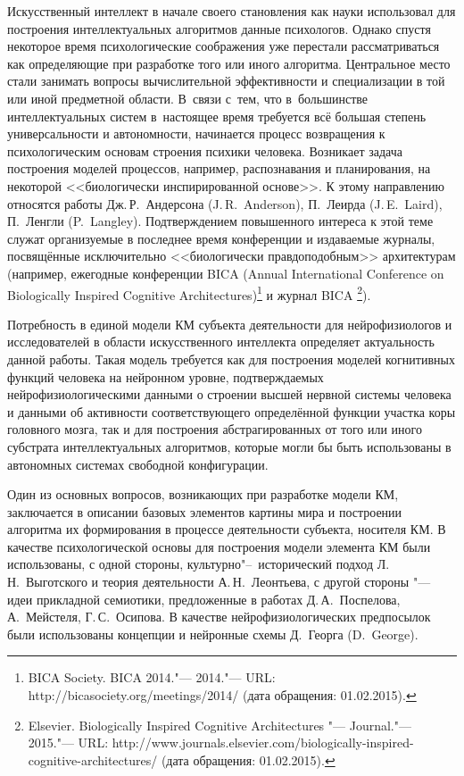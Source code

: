 Искусственный интеллект в начале своего становления как науки использовал для построения интеллектуальных алгоритмов данные психологов. Однако спустя некоторое время психологические соображения уже перестали рассматриваться как определяющие при разработке того или иного алгоритма. Центральное место стали занимать вопросы вычислительной эффективности и специализации в той или иной предметной области. В~связи с~тем, что в~большинстве интеллектуальных систем в~настоящее время требуется всё большая степень универсальности и автономности, начинается процесс возвращения к психологическим основам строения психики человека. Возникает задача построения моделей процессов, например, распознавания и планирования, на некоторой <<биологически инспирированной основе>>. К этому направлению относятся работы Дж.\,Р.~Андерсона (J.\,R.~Anderson), П.~Леирда (J.\,E.~Laird), П.~Ленгли (P.~Langley). Подтверждением повышенного интереса к этой теме служат организуемые в последнее время конференции и издаваемые журналы, посвящённые исключительно <<биологически правдоподобным>> архитектурам (например, ежегодные конференции BICA (Annual International Conference on Biologically Inspired Cognitive Architectures)\footnote{BICA Society. BICA 2014."--- 2014."--- URL: http://bicasociety.org/meetings/2014/ (дата	обращения: 01.02.2015).} и журнал BICA \footnote{Elsevier. Biologically Inspired Cognitive Architectures "--- Journal."--- 2015."---
URL: http://www.journals.elsevier.com/biologically-inspired-cognitive-architectures/ (дата	обращения: 01.02.2015).}).

Потребность в единой модели КМ субъекта деятельности для нейрофизиологов и исследователей в области искусственного интеллекта определяет актуальность данной работы. Такая модель требуется как для построения моделей когнитивных функций человека на нейронном уровне, подтверждаемых нейрофизиологическими данными о строении высшей нервной системы человека и данными об активности соответствующего определённой функции участка коры головного мозга, так и для построения абстрагированных от того или иного субстрата интеллектуальных алгоритмов, которые могли бы быть использованы в автономных системах свободной конфигурации.

Один из основных вопросов, возникающих при разработке модели КМ, заключается в описании базовых элементов картины мира и построении алгоритма их формирования в процессе деятельности субъекта, носителя КМ. В качестве психологической основы для построения модели элемента КМ были использованы, с одной стороны, культурно"--~исторический подход Л.\,Н.~Выготского и теория деятельности А.\,Н.~Леонтьева, с другой стороны "--- идеи прикладной семиотики, предложенные в работах Д.\,А.~Поспелова, А.~Мейстеля, Г.\,С.~Осипова. В качестве нейрофизиологических предпосылок были использованы концепции и нейронные схемы Д.~Георга (D.~George).


